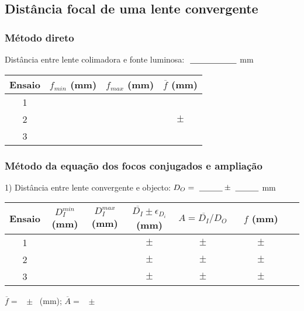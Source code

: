 \documentclass[a4paper,12pt]{article}  %
\begin{document}
\subsection{\sf Distância focal de uma lente convergente}



\subsubsection{\sf Método direto}

Distância entre lente colimadora e fonte luminosa: $~\underline{\makebox[2cm][r]{~}}$ mm

\begin{center}
	\begin{tabular}{|c|c|c|c|}
	\hline
	 Ensaio & $ f_{min}$ (mm) & $ f_{max}$ (mm)  & $\overline{f}$ (mm)\\
	\hline \hline
	 1 & \makebox[2cm][r]{} &  \makebox[2cm][r]{}  & \makebox[2cm][r]{}  \\ \cline{1-3}
	  2 & & &  $\quad \pm \quad$ \\ \cline{1-3}
  	  3 & & & \\  \hline
			\end{tabular}
\end{center}
\subsubsection{\sf Método da equação dos focos conjugados e ampliação}

1) Distância entre lente convergente e objecto: $D_O=~\underline{\makebox[1cm][r]{~}}\pm~\underline{\makebox[1cm][r]{~}}$ mm

\begin{center}
	\begin{tabular}{|c|c|c|c|c|c|c|}
	\hline
	 Ensaio &
	  $ D_{I}^{min}$ (mm) & 
	  $ D_I^{max}$ (mm) & 
	  $ \overline{D_{I}}\pm\epsilon_{D_i}$ (mm) &
	  $A=\overline{D_I}/D_O$ &
	  $f$ (mm) \\
	\hline \hline
	1 & & &  $\quad \pm \quad$ & $\quad \pm \quad$& $\qquad \pm \qquad$ \\ \cline{1-6}
	2 & & & $\quad \pm \quad$ & $\quad \pm \quad$& $\quad \pm \quad$  \\ \cline{1-6}
	3 & & & $\quad \pm \quad$ & $\quad \pm \quad$& $\quad \pm \quad$ \\ \hline
	  \end{tabular}
\end{center}
 $\overline{f} =$ ~\underline{\makebox[1cm][r]{~}}$\pm$~\underline{\makebox[1cm][r]{~}} (mm);  $\overline{A} =$ ~\underline{\makebox[1cm][r]{~}}$\pm$~\underline{\makebox[1cm][r]{~}}
\end{document}
